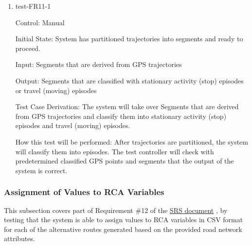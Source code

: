 \documentclass[12pt, titlepage]{article}
\begin{document}
\begin{enumerate}

\item{test-FR11-1\\} \label{test-FR11-1}

Control: Manual 
					
Initial State: System has partitioned trajectories into segments and ready to proceed.
					
Input: Segments that are derived from GPS trajectories
					
Output: Segments that are classified with stationary activity (stop) episodes or travel (moving) episodes

Test Case Derivation: The system will take over Segments that are derived from GPS trajectories and classify them into stationary activity (stop) episodes and travel (moving) episodes.
					
How this test will be performed: After trajectories are partitioned, the system will classify them into episodes. The test controller will check with predetermined classified GPS points and segments that the output of the system is correct.

\end{enumerate}

\subsubsection{Assignment of Values to RCA Variables}

This subsection covers part of Requirement \#12 of the \href{https://github.com/paezha/PyERT-BLACK/blob/main/docs/SRS/SRS.pdf}{SRS document} \citep{SRS}, by testing that the system is able to assign values to RCA variables in CSV format for each of the alternative routes generated based on the provided road network attributes.
\end{document}
